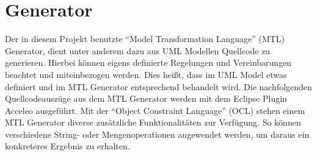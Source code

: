 \chapter{Generator}
\label{Generator}
Der in diesem Projekt benutzte “Model Transformation Language” (MTL) Generator, dient unter anderem dazu aus UML Modellen Quellcode zu generieren. Hierbei können eigens definierte Regelungen und Vereinbarungen beachtet und miteinbezogen werden. Dies heißt, dass im UML Model etwas definiert und im MTL Generator entsprechend behandelt wird.
Die nachfolgenden Quellcodeauszüge aus dem MTL Generator werden mit dem Eclipse Plugin Acceleo ausgeführt. Mit der “Object Constraint Language” (OCL) stehen einem MTL Generator diverse zusätzliche Funktionalitäten zur Verfügung. So können verschiedene String- oder Mengenoperationen angewendet werden, um daraus ein konkreteres Ergebnis zu erhalten.




